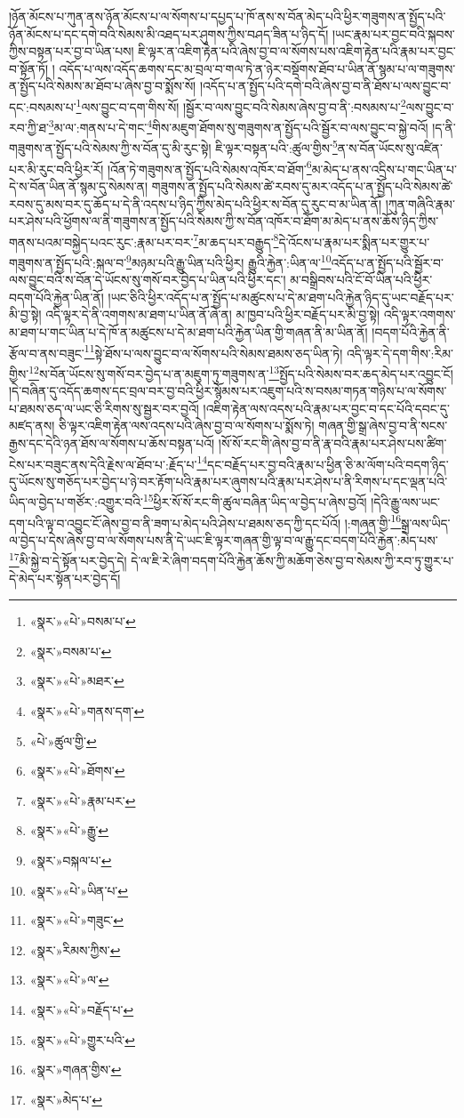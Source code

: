 །ཉོན་མོངས་པ་ཀུན་ནས་ཉོན་མོངས་པ་ལ་སོགས་པ་དཔྱད་པ་ཁོ་ནས་ས་བོན་མེད་པའི་ཕྱིར་གཟུགས་ན་སྤྱོད་པའི་ཉོན་མོངས་པ་དང་དགེ་བའི་སེམས་མི་འཐད་པར་ཤུགས་ཀྱིས་བཤད་ཟིན་པ་ཉིད་དོ། །ཡང་རྣམ་པར་བྱང་བའི་སྐབས་ཀྱིས་བསྟན་པར་བྱ་བ་ཡིན་པས། ཇི་ལྟར་ན་འཇིག་རྟེན་པའི་ཞེས་བྱ་བ་ལ་སོགས་པས་འཇིག་རྟེན་པའི་རྣམ་པར་བྱང་བ་སྟོན་ཏོ། །
འདོད་པ་ལས་འདོད་ཆགས་དང་མ་བྲལ་བ་གལ་ཏེ་ན་ཉེར་བསྡོགས་ཐོབ་པ་ཡིན་ནོ་སྙམ་པ་ལ་གཟུགས་ན་སྤྱོད་པའི་སེམས་མ་ཐོབ་པ་ཞེས་བྱ་བ་སྨོས་སོ། །འདོད་པ་ན་སྤྱོད་པའི་དགེ་བའི་ཞེས་བྱ་བ་ནི་ཐོས་པ་ལས་བྱུང་བ་དང་:བསམས་པ་\footnote{«སྣར་»«པེ་»བསམ་པ་}ལས་བྱུང་བ་དག་གིས་སོ། །སྦྱོར་བ་ལས་བྱུང་བའི་སེམས་ཞེས་བྱ་བ་ནི་:བསམས་པ་\footnote{«སྣར་»བསམ་པ་}ལས་བྱུང་བ་རབ་ཀྱི་ཐ་\footnote{«སྣར་»«པེ་»མཐར་}མ་ལ་:གནས་པ་དེ་གང་\footnote{«སྣར་»«པེ་»གནས་དག་}གིས་མཇུག་ཐོགས་སུ་གཟུགས་ན་སྤྱོད་པའི་སྦྱོར་བ་ལས་བྱུང་བ་སྐྱེ་བའོ། །ད་ནི་གཟུགས་ན་སྤྱོད་པའི་སེམས་ཀྱི་ས་བོན་དུ་མི་རུང་སྟེ། ཇི་ལྟར་བསྟན་པའི་:ཚུལ་གྱིས་\footnote{«པེ་»ཚུལ་གྱི་}ན་ས་བོན་ཡོངས་སུ་འཛིན་པར་མི་རུང་བའི་ཕྱིར་རོ། །འོན་ཏེ་གཟུགས་ན་སྤྱོད་པའི་སེམས་འཁོར་བ་ཐོག་\footnote{«སྣར་»«པེ་»ཐོགས་}མ་མེད་པ་ནས་འདྲིས་པ་གང་ཡིན་པ་དེ་ས་བོན་ཡིན་ནོ་སྙམ་དུ་སེམས་ན། གཟུགས་ན་སྤྱོད་པའི་སེམས་ཚེ་རབས་དུ་མར་འདོད་པ་ན་སྤྱོད་པའི་སེམས་ཚེ་རབས་དུ་མས་བར་དུ་ཆོད་པ་དེ་ནི་འདས་པ་ཉིད་ཀྱིས་མེད་པའི་ཕྱིར་ས་བོན་དུ་རུང་བ་མ་ཡིན་ནོ། །ཀུན་གཞིའི་རྣམ་པར་ཤེས་པའི་ཕྱོགས་ལ་ནི་གཟུགས་ན་སྤྱོད་པའི་སེམས་ཀྱི་ས་བོན་འཁོར་བ་ཐོག་མ་མེད་པ་ནས་ཆོས་ཉིད་ཀྱིས་གནས་པའམ་བསྐྱེད་པའང་རུང་:རྣམ་པར་བར་\footnote{«སྣར་»«པེ་»རྣམ་པར་}མ་ཆད་པར་བརྒྱུད་\footnote{«སྣར་»«པེ་»རྒྱུ་}དེ་འོངས་པ་རྣམ་པར་སྨིན་པར་གྱུར་པ་གཟུགས་ན་སྤྱོད་པའི་:སྐལ་བ་\footnote{«སྣར་»བསྐལ་པ་}མཉམ་པའི་རྒྱུ་ཡིན་པའི་ཕྱིར། རྒྱུའི་རྐྱེན་:ཡིན་ལ་\footnote{«སྣར་»«པེ་»ཡིན་པ་}འདོད་པ་ན་སྤྱོད་པའི་སྦྱོར་བ་ལས་བྱུང་བའི་ས་བོན་དེ་ཡོངས་སུ་གསོ་བར་བྱེད་པ་ཡིན་པའི་ཕྱིར་དང་། མ་བསྒྲིབས་པའི་ངོ་བོ་ཡིན་པའི་ཕྱིར་བདག་པོའི་རྐྱེན་ཡིན་ནོ། །ཡང་ཅིའི་ཕྱིར་འདོད་པ་ན་སྤྱོད་པ་མཚུངས་པ་དེ་མ་ཐག་པའི་རྐྱེན་ཉིད་དུ་ཡང་བརྗོད་པར་མི་བྱ་སྟེ། འདི་ལྟར་དེ་ནི་འགགས་མ་ཐག་པ་ཡིན་ནོ་ཞེ་ན། མ་ཁྱབ་པའི་ཕྱིར་བརྗོད་པར་མི་བྱ་སྟེ། འདི་ལྟར་འགགས་མ་ཐག་པ་གང་ཡིན་པ་དེ་ཁོ་ན་མཚུངས་པ་དེ་མ་ཐག་པའི་རྐྱེན་ཡིན་གྱི་གཞན་ནི་མ་ཡིན་ནོ། །བདག་པོའི་རྐྱེན་ནི་རྩོལ་བ་ནས་བཟུང་\footnote{«སྣར་»«པེ་»གཟུང་}སྟེ་ཐོས་པ་ལས་བྱུང་བ་ལ་སོགས་པའི་སེམས་ཐམས་ཅད་ཡིན་ཏེ། འདི་ལྟར་དེ་དག་གིས་:རིམ་གྱིས་\footnote{«སྣར་»རིམས་ཀྱིས་}ས་བོན་ཡོངས་སུ་གསོ་བར་བྱེད་པ་ན་མཇུག་ཏུ་གཟུགས་ན་\footnote{«སྣར་»«པེ་»ལ་}སྤྱོད་པའི་སེམས་བར་ཆད་མེད་པར་འབྱུང་ངོ། །དེ་བཞིན་དུ་འདོད་ཆགས་དང་བྲལ་བར་བྱ་བའི་ཕྱིར་སྙོམས་པར་འཇུག་པའི་ས་བསམ་གཏན་གཉིས་པ་ལ་སོགས་པ་ཐམས་ཅད་ལ་ཡང་ཅི་རིགས་སུ་སྦྱར་བར་བྱའོ། །འཇིག་རྟེན་ལས་འདས་པའི་རྣམ་པར་བྱང་བ་དང་པོའི་དབང་དུ་མཛད་ནས། ཅི་ལྟར་འཇིག་རྟེན་ལས་འདས་པའི་ཞེས་བྱ་བ་ལ་སོགས་པ་སྨོས་ཏེ། གཞན་གྱི་སྒྲ་ཞེས་བྱ་བ་ནི་སངས་རྒྱས་དང་དེའི་ཉན་ཐོས་ལ་སོགས་པ་ཆོས་བསྟན་པའོ། །སོ་སོ་རང་གི་ཞེས་བྱ་བ་ནི་རྣ་བའི་རྣམ་པར་ཤེས་པས་ཚིག་ངེས་པར་བཟུང་ནས་དེའི་རྗེས་ལ་ཐོབ་པ་:རྗོད་པ་\footnote{«སྣར་»«པེ་»བརྗོད་པ་}དང་བརྗོད་པར་བྱ་བའི་རྣམ་པ་ཕྱིན་ཅི་མ་ལོག་པའི་བདག་ཉིད་དུ་ཡོངས་སུ་གཅོད་པར་བྱེད་པ་ཉེ་བར་རྟོག་པའི་རྣམ་པར་ཞུགས་པའི་རྣམ་པར་ཤེས་པ་ནི་རིགས་པ་དང་ལྡན་པའི་ཡིད་ལ་བྱེད་པ་གཙོར་:འགྱུར་བའི་\footnote{«སྣར་»«པེ་»གྱུར་པའི་}ཕྱིར་སོ་སོ་རང་གི་ཚུལ་བཞིན་ཡིད་ལ་བྱེད་པ་ཞེས་བྱའོ། །དེའི་རྒྱུ་ལས་ཡང་དག་པའི་ལྟ་བ་འབྱུང་ངོ་ཞེས་བྱ་བ་ནི་ཟག་པ་མེད་པའི་ཤེས་པ་ཐམས་ཅད་ཀྱི་དང་པོའོ། །:གཞན་གྱི་\footnote{«སྣར་»གཞན་གྱིས་}སྒྲ་ལས་ཡིད་ལ་བྱེད་པ་དེས་ཞེས་བྱ་བ་ལ་སོགས་པས་ནི་དེ་ཡང་ཇི་ལྟར་གཞན་གྱི་ལྟ་བ་ལ་རྒྱུ་དང་བདག་པོའི་རྐྱེན་:མེད་པས་\footnote{«སྣར་»མེད་པ་}མི་སྐྱེ་བ་དེ་སྟོན་པར་བྱེད་དེ། དེ་ལ་ཇི་རེ་ཞིག་བདག་པོའི་རྐྱེན་ཆོས་ཀྱི་མཆོག་ཅེས་བྱ་བ་སེམས་ཀྱི་རབ་ཏུ་གྱུར་པ་དེ་མེད་པར་སྟོན་པར་བྱེད་དོ། 